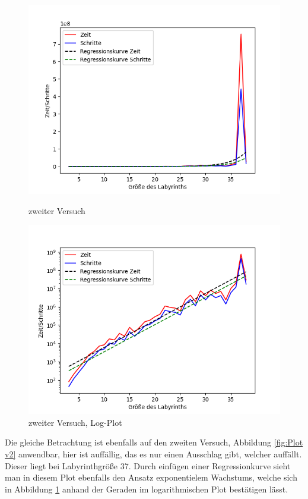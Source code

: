 \documentclass[12pt, a4paper, titlepage]{article}
\begin{document}
\begin{figure}[h]
\begin{minipage}{.5\textwidth}
	\includegraphics[scale=.45]{v2Aus.png}
	\caption{zweiter Versuch}
	\label{fig:Plot v2}
\end{minipage}
\begin{minipage}{.5\textwidth}
	\includegraphics[scale=.45]{v2AusLog.png}
	\caption{zweiter Versuch, Log-Plot}
	\label{fig:Plot v2Log}
\end{minipage}
\end{figure}

Die gleiche Betrachtung ist ebenfalls auf den zweiten Versuch, Abbildung \ref{fig:Plot v2} anwendbar, hier ist auffällig, das es nur einen Ausschlag gibt, welcher auffällt.
Dieser liegt bei Labyrinthgröße 37.
Durch einfügen einer Regressionkurve sieht man in diesem Plot ebenfalls den Ansatz exponentielem Wachstums, welche sich in Abbildung \ref{fig:Plot v2Log} anhand der Geraden im logarithmischen Plot bestätigen lässt.
\end{document}
